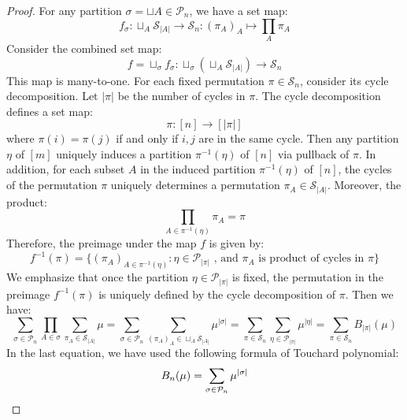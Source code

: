 \documentclass[10pt,a4paper]{amsart}
\begin{document}
\begin{proof}
    For any partition $\sigma =\sqcup A\in\mathcal{P}_n$, we have a set map:
    \begin{equation}
        f_\sigma:\sqcup_A\mathcal{S}_{|A|}\rightarrow \mathcal{S}_n: (\pi_A)_A\mapsto \prod_A\pi_A
    \end{equation}
    Consider the combined set map:
    \begin{equation}
        f = \sqcup_\sigma f_\sigma: \sqcup_\sigma(\sqcup_A\mathcal{S}_{|A|})\rightarrow \mathcal{S}_n
    \end{equation}
    This map is many-to-one. For each fixed permutation $\pi \in\mathcal{S}_n$, consider its cycle decomposition. Let $|\pi|$ be the number of cycles in $\pi$. The cycle decomposition defines a set map:
    \begin{equation}
        \pi:[n]\rightarrow[|\pi|]
    \end{equation}
    where $\pi(i) = \pi(j)$ if and only if $i,j$ are in the same cycle. Then any partition $\eta$ of $[m]$ uniquely induces a partition $\pi^{-1}(\eta)$ of $[n]$ via pullback of $\pi$. In addition, for each subset $A$ in the induced partition $\pi^{-1}(\eta)$ of $[n]$, the cycles of the permutation $\pi$ uniquely determines a permutation $\pi_A\in\mathcal{S}_{|A|}$. Moreover, the product:
    \begin{equation}
        \prod_{A\in \pi^{-1}(\eta)}\pi_A = \pi
    \end{equation}
    Therefore, the preimage under the map $f$ is given by:
    \begin{equation}
        f^{-1}(\pi) = \{(\pi_A)_{A\in \pi^{-1}(\eta)}:\eta\in\mathcal{P}_{|\pi|}\text{ , and }\pi_A\text{ is product of cycles in }\pi\}
    \end{equation}
    We emphasize that once the partition $\eta\in\mathcal{P}_{|\pi|}$ is fixed, the permutation in the preimage $f^{-1}(\pi)$ is uniquely defined by the cycle decomposition of $\pi$.
    Then we have:
    \begin{equation}\label{equation:resummation}
        \sum_{\sigma\in\mathcal{P}_n}\prod_{A\in\sigma}\sum_{\pi_A\in\mathcal{S}_{|A|}}\mu = \sum_{\sigma\in\mathcal{P}_n}\sum_{(\pi_A)_A\in\sqcup_A\mathcal{S}_{|A|}}\mu^{|\sigma|} = \sum_{\pi\in\mathcal{S}_n}\sum_{\eta\in \mathcal{P}_{|\pi|}}\mu^{|\eta|} = \sum_{\pi\in\mathcal{S}_n}B_{|\pi|}(\mu)
    \end{equation}
    In the last equation, we have used the following formula of Touchard polynomial:
    \begin{equation}
        B_n(\mu) = \sum_{\sigma\in\mathcal{P}_n}\mu^{|\sigma|}\qedhere
    \end{equation}
\end{proof}
\end{document}
